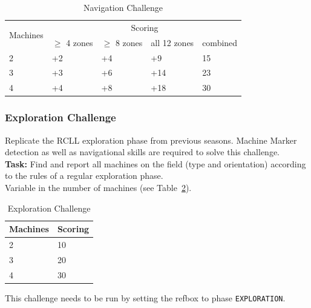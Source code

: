 \documentclass[12pt,twoside]{article}
\newcommand{\reftab}[1]{Table~\ref{#1}}
\begin{document}
\begin{table}[!htb]
 \centering
 \begin{tabular}{l|l|l|l|l}
  \multirow{2}{*}{Machines}
  & \multicolumn{4}{c}{Scoring} \\\cline{2-5}
	& $\geq$ 4 zones  & $\geq$ 8 zones & all 12 zones  & combined \\\hline\hline
	 2 & +2 & +4 & +9 & 15 \\
	 3 & +3 & +6 & +14 & 23 \\
	 4 & +4 & +8 & +18 & 30 \\
 \end{tabular}
 \caption{Navigation Challenge}
 \label{tab:challenge-navigation}
\end{table}

\subsubsection{Exploration Challenge}\label{sec:challenge-exploration}
Replicate the \ac{RCLL} exploration phase from previous seasons.
Machine Marker detection as well as navigational skills are required to solve
this challenge.\\
\textbf{Task:} Find and report all machines on the field (type and orientation)
according to the rules of a regular exploration phase.
\\
Variable in the number of machines
(see \reftab{tab:challenge-exploration}).
\begin{table}[!htb]
 \centering
 \begin{tabular}{l|l}
  Machines & Scoring \\\hline
  2   & 10 \\
  3   & 20 \\
  4   & 30 \\
 \end{tabular}
 \caption{Exploration Challenge}
 \label{tab:challenge-exploration}
\end{table}
This challenge needs to be run by setting the \ac{refbox} to phase
\texttt{EXPLORATION}.
\end{document}
